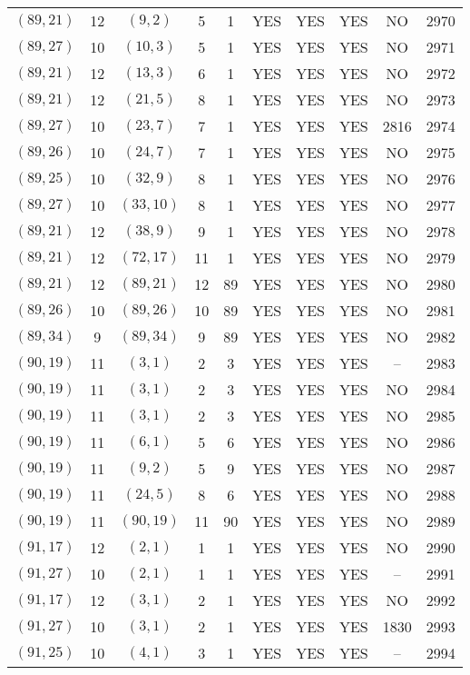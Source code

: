 \begin{longtable}{|c|c|c|c|c|c|c|c|c|c|}
$(89, 21)$ & 12 & $(9, 2)$ & 5 & 1 & YES & YES & YES & NO & 2970\\
$(89, 27)$ & 10 & $(10, 3)$ & 5 & 1 & YES & YES & YES & NO & 2971\\
$(89, 21)$ & 12 & $(13, 3)$ & 6 & 1 & YES & YES & YES & NO & 2972\\
$(89, 21)$ & 12 & $(21, 5)$ & 8 & 1 & YES & YES & YES & NO & 2973\\
$(89, 27)$ & 10 & $(23, 7)$ & 7 & 1 & YES & YES & YES & 2816 & 2974\\
$(89, 26)$ & 10 & $(24, 7)$ & 7 & 1 & YES & YES & YES & NO & 2975\\
$(89, 25)$ & 10 & $(32, 9)$ & 8 & 1 & YES & YES & YES & NO & 2976\\
$(89, 27)$ & 10 & $(33, 10)$ & 8 & 1 & YES & YES & YES & NO & 2977\\
$(89, 21)$ & 12 & $(38, 9)$ & 9 & 1 & YES & YES & YES & NO & 2978\\
$(89, 21)$ & 12 & $(72, 17)$ & 11 & 1 & YES & YES & YES & NO & 2979\\
$(89, 21)$ & 12 & $(89, 21)$ & 12 & 89 & YES & YES & YES & NO & 2980\\
$(89, 26)$ & 10 & $(89, 26)$ & 10 & 89 & YES & YES & YES & NO & 2981\\
$(89, 34)$ & 9 & $(89, 34)$ & 9 & 89 & YES & YES & YES & NO & 2982\\
$(90, 19)$ & 11 & $(3, 1)$ & 2 & 3 & YES & YES & YES & -- & 2983\\
$(90, 19)$ & 11 & $(3, 1)$ & 2 & 3 & YES & YES & YES & NO & 2984\\
$(90, 19)$ & 11 & $(3, 1)$ & 2 & 3 & YES & YES & YES & NO & 2985\\
$(90, 19)$ & 11 & $(6, 1)$ & 5 & 6 & YES & YES & YES & NO & 2986\\
$(90, 19)$ & 11 & $(9, 2)$ & 5 & 9 & YES & YES & YES & NO & 2987\\
$(90, 19)$ & 11 & $(24, 5)$ & 8 & 6 & YES & YES & YES & NO & 2988\\
$(90, 19)$ & 11 & $(90, 19)$ & 11 & 90 & YES & YES & YES & NO & 2989\\
$(91, 17)$ & 12 & $(2, 1)$ & 1 & 1 & YES & YES & YES & NO & 2990\\
$(91, 27)$ & 10 & $(2, 1)$ & 1 & 1 & YES & YES & YES & -- & 2991\\
$(91, 17)$ & 12 & $(3, 1)$ & 2 & 1 & YES & YES & YES & NO & 2992\\
$(91, 27)$ & 10 & $(3, 1)$ & 2 & 1 & YES & YES & YES & 1830 & 2993\\
$(91, 25)$ & 10 & $(4, 1)$ & 3 & 1 & YES & YES & YES & -- & 2994\\

\end{longtable}
